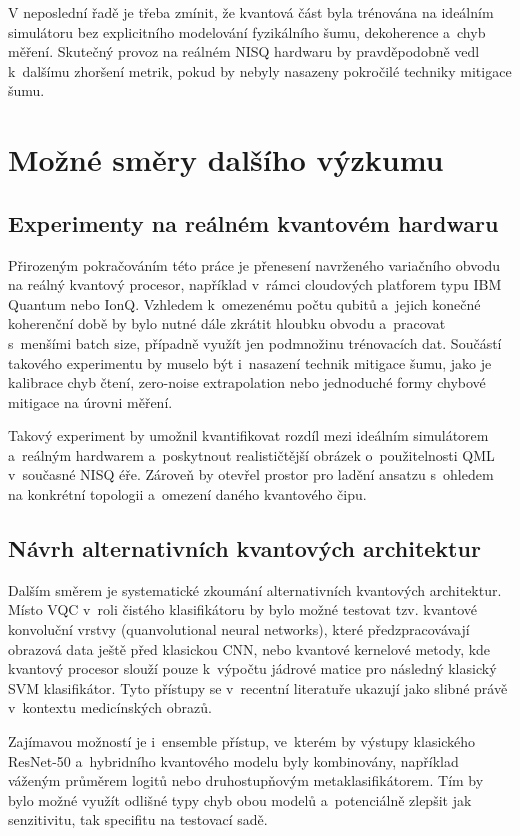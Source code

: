 \documentclass[12pt, a4paper]{report}
\begin{document}
V neposlední řadě je třeba zmínit, že kvantová část byla trénována na ideálním simulátoru bez explicitního modelování fyzikálního šumu, dekoherence a~chyb měření. Skutečný provoz na reálném NISQ hardwaru by pravděpodobně vedl k dalšímu zhoršení metrik, pokud by nebyly nasazeny pokročilé techniky mitigace šumu.

\section{Možné směry dalšího výzkumu} \label{sec:future_work}

\subsection{Experimenty na reálném kvantovém hardwaru}

Přirozeným pokračováním této práce je přenesení navrženého variačního obvodu na reálný kvantový procesor, například v~rámci cloudových platforem typu IBM Quantum nebo IonQ. Vzhledem k~omezenému počtu qubitů a~jejich konečné koherenční době by bylo nutné dále zkrátit hloubku obvodu a~pracovat s~menšími batch size, případně využít jen podmnožinu trénovacích dat. Součástí takového experimentu by muselo být i~nasazení technik mitigace šumu, jako je kalibrace chyb čtení, zero-noise extrapolation nebo jednoduché formy chybové mitigace na úrovni měření.

Takový experiment by umožnil kvantifikovat rozdíl mezi ideálním simulátorem a~reálným hardwarem a~poskytnout realističtější obrázek o~použitelnosti QML v~současné NISQ éře. Zároveň by otevřel prostor pro ladění ansatzu s~ohledem na konkrétní topologii a~omezení daného kvantového čipu.

\subsection{Návrh alternativních kvantových architektur}

Dalším směrem je systematické zkoumání alternativních kvantových architektur. Místo VQC v~roli čistého klasifikátoru by bylo možné testovat tzv. kvantové konvoluční vrstvy (quanvolutional neural networks), které předzpracovávají obrazová data ještě před klasickou CNN, nebo kvantové kernelové metody, kde kvantový procesor slouží pouze k~výpočtu jádrové matice pro následný klasický SVM klasifikátor. Tyto přístupy se v~recentní literatuře ukazují jako slibné právě v~kontextu medicínských obrazů.

Zajímavou možností je i~ensemble přístup, ve~kterém by výstupy klasického ResNet-50 a~hybridního kvantového modelu byly kombinovány, například váženým průměrem logitů nebo druhostupňovým metaklasifikátorem. Tím by bylo možné využít odlišné typy chyb obou modelů a~potenciálně zlepšit jak senzitivitu, tak specifitu na testovací sadě.
\end{document}
